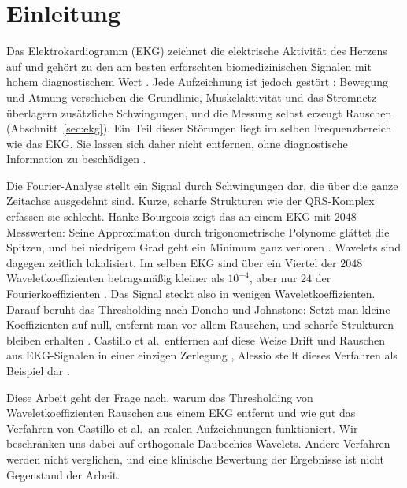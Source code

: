 \documentclass[a4paper,11pt,bibliography=totoc,listof=totoc,headinclude=true,cleardoublepage=empty,oneside]{scrbook}
\theoremstyle{plain}
\theoremstyle{definition}
\begin{document}
\chapter{Einleitung}
\label{chapter:einleitung}

Das Elektrokardiogramm (EKG) zeichnet die elektrische Aktivität des Herzens
auf und gehört zu den am besten erforschten biomedizinischen Signalen mit
hohem diagnostischem Wert \cite[Kap.~2.1]{gacek}. %
Jede Aufzeichnung ist jedoch gestört
\cite[Kap.~2.3]{gacek}: %
Bewegung und Atmung verschieben die Grundlinie, Muskelaktivität und das
Stromnetz überlagern zusätzliche Schwingungen, und die Messung selbst
erzeugt Rauschen (Abschnitt~\ref{sec:ekg}). Ein Teil dieser Störungen liegt im
selben Frequenzbereich wie das EKG. Sie lassen sich daher nicht entfernen,
ohne diagnostische Information zu beschädigen \cite[Kap.~2.3]{gacek}. %

Die Fourier-Analyse stellt ein Signal durch Schwingungen dar, die über die
ganze Zeitachse ausgedehnt sind. Kurze, scharfe Strukturen wie der
QRS-Komplex erfassen sie schlecht. Hanke-Bourgeois zeigt das an einem EKG mit
$2048$ Messwerten: Seine Approximation durch trigonometrische Polynome glättet
die Spitzen, und bei niedrigem Grad geht ein Minimum ganz verloren
\cite[Bsp.~52.7]{hankebourgeois}. %
Wavelets sind dagegen zeitlich lokalisiert. Im selben EKG sind über ein
Viertel der $2048$ Waveletkoeffizienten betragsmä\ss ig kleiner als $10^{-4}$,
aber nur $24$ der Fourierkoeffizienten \cite[Bsp.~56.3]{hankebourgeois}. %
Das Signal steckt also in wenigen Waveletkoeffizienten. Darauf beruht das
Thresholding nach Donoho und Johnstone: Setzt man kleine Koeffizienten auf
null, entfernt man vor allem Rauschen, und scharfe Strukturen bleiben erhalten
\cite[Kap.~11.3.1]{mallat}. %
Castillo et al.\ entfernen auf diese Weise Drift und Rauschen aus EKG-Signalen
in einer einzigen Zerlegung \cite{castillo}, %
Alessio stellt dieses Verfahren als Beispiel dar \cite[Kap.~15.2.4]{alessio}. %

Diese Arbeit geht der Frage nach, warum das Thresholding von
Waveletkoeffizienten Rauschen aus einem EKG entfernt und wie gut das
Verfahren von Castillo et al.\ an realen Aufzeichnungen funktioniert. Wir
beschränken uns dabei auf orthogonale Daubechies-Wavelets. Andere Verfahren
werden nicht verglichen, und eine klinische Bewertung der Ergebnisse ist nicht
Gegenstand der Arbeit.
\end{document}
